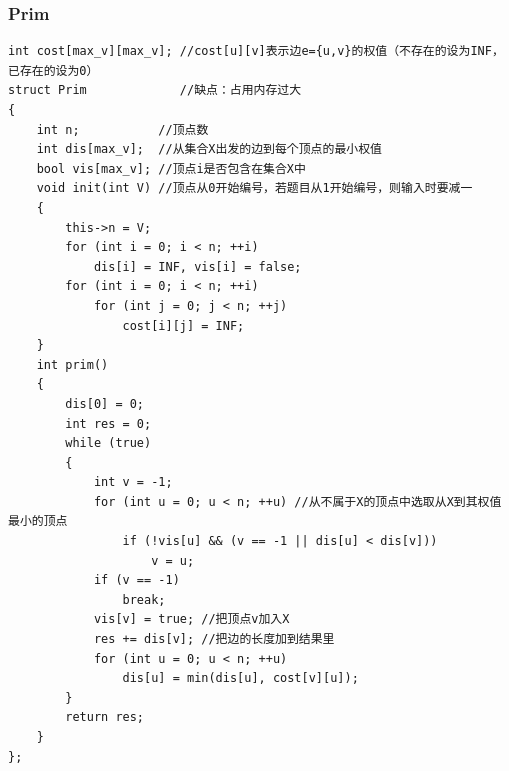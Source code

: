 \documentclass[twoside]{article}
\begin{document}
\subsubsection{Prim}
\begin{lstlisting}
int cost[max_v][max_v]; //cost[u][v]表示边e={u,v}的权值（不存在的设为INF，已存在的设为0）
struct Prim             //缺点：占用内存过大
{
    int n;           //顶点数
    int dis[max_v];  //从集合X出发的边到每个顶点的最小权值
    bool vis[max_v]; //顶点i是否包含在集合X中
    void init(int V) //顶点从0开始编号，若题目从1开始编号，则输入时要减一
    {
        this->n = V;
        for (int i = 0; i < n; ++i)
            dis[i] = INF, vis[i] = false;
        for (int i = 0; i < n; ++i)
            for (int j = 0; j < n; ++j)
                cost[i][j] = INF;
    }
    int prim()
    {
        dis[0] = 0;
        int res = 0;
        while (true)
        {
            int v = -1;
            for (int u = 0; u < n; ++u) //从不属于X的顶点中选取从X到其权值最小的顶点
                if (!vis[u] && (v == -1 || dis[u] < dis[v]))
                    v = u;
            if (v == -1)
                break;
            vis[v] = true; //把顶点v加入X
            res += dis[v]; //把边的长度加到结果里
            for (int u = 0; u < n; ++u)
                dis[u] = min(dis[u], cost[v][u]);
        }
        return res;
    }
};
\end{lstlisting}
\end{document}
